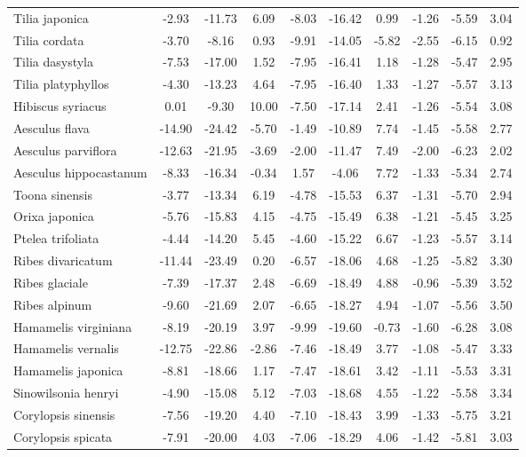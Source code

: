 \documentclass[11pt]{article}
\begin{document}
\begin{longtable}{p{1.50in}c{0.32in}c{0.32in}c{0.32in}c{0.32in}c{0.32in}c{0.32in}c{0.2in}c{0.3in}c{0.1in}}
  Tilia japonica & -2.93 & -11.73 & 6.09 & -8.03 & -16.42 & 0.99 & -1.26 & -5.59 & 3.04 \\ 
  Tilia cordata & -3.70 & -8.16 & 0.93 & -9.91 & -14.05 & -5.82 & -2.55 & -6.15 & 0.92 \\ 
  Tilia dasystyla & -7.53 & -17.00 & 1.52 & -7.95 & -16.41 & 1.18 & -1.28 & -5.47 & 2.95 \\ 
  Tilia platyphyllos & -4.30 & -13.23 & 4.64 & -7.95 & -16.40 & 1.33 & -1.27 & -5.57 & 3.13 \\ 
  Hibiscus syriacus & 0.01 & -9.30 & 10.00 & -7.50 & -17.14 & 2.41 & -1.26 & -5.54 & 3.08 \\ 
  Aesculus flava & -14.90 & -24.42 & -5.70 & -1.49 & -10.89 & 7.74 & -1.45 & -5.58 & 2.77 \\ 
  Aesculus parviflora & -12.63 & -21.95 & -3.69 & -2.00 & -11.47 & 7.49 & -2.00 & -6.23 & 2.02 \\ 
  Aesculus hippocastanum & -8.33 & -16.34 & -0.34 & 1.57 & -4.06 & 7.72 & -1.33 & -5.34 & 2.74 \\ 
  Toona sinensis & -3.77 & -13.34 & 6.19 & -4.78 & -15.53 & 6.37 & -1.31 & -5.70 & 2.94 \\ 
  Orixa japonica & -5.76 & -15.83 & 4.15 & -4.75 & -15.49 & 6.38 & -1.21 & -5.45 & 3.25 \\ 
  Ptelea trifoliata & -4.44 & -14.20 & 5.45 & -4.60 & -15.22 & 6.67 & -1.23 & -5.57 & 3.14 \\ 
  Ribes divaricatum & -11.44 & -23.49 & 0.20 & -6.57 & -18.06 & 4.68 & -1.25 & -5.82 & 3.30 \\ 
  Ribes glaciale & -7.39 & -17.37 & 2.48 & -6.69 & -18.49 & 4.88 & -0.96 & -5.39 & 3.52 \\ 
  Ribes alpinum & -9.60 & -21.69 & 2.07 & -6.65 & -18.27 & 4.94 & -1.07 & -5.56 & 3.50 \\ 
  Hamamelis virginiana & -8.19 & -20.19 & 3.97 & -9.99 & -19.60 & -0.73 & -1.60 & -6.28 & 3.08 \\ 
  Hamamelis vernalis & -12.75 & -22.86 & -2.86 & -7.46 & -18.49 & 3.77 & -1.08 & -5.47 & 3.33 \\ 
  Hamamelis japonica & -8.81 & -18.66 & 1.17 & -7.47 & -18.61 & 3.42 & -1.11 & -5.53 & 3.31 \\ 
  Sinowilsonia henryi & -4.90 & -15.08 & 5.12 & -7.03 & -18.68 & 4.55 & -1.22 & -5.58 & 3.34 \\ 
  Corylopsis sinensis & -7.56 & -19.20 & 4.40 & -7.10 & -18.43 & 3.99 & -1.33 & -5.75 & 3.21 \\ 
  Corylopsis spicata & -7.91 & -20.00 & 4.03 & -7.06 & -18.29 & 4.06 & -1.42 & -5.81 & 3.03 \\ 

\end{longtable}
\end{document}

